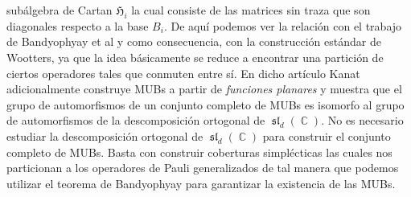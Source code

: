 \documentclass[a4paper]{report}
\DeclareMathOperator{\C}{\mathbb{C}}
\DeclareMathOperator{\Sl}{\mathfrak{sl}}
\begin{document}
  subálgebra de Cartan $\mathfrak{H}_i$ la cual consiste de
  las matrices sin traza que son diagonales respecto a la
  base $B_i$. De aquí podemos ver la relación con el trabajo
  de Bandyophyay et al y como consecuencia, con la
  construcción estándar de Wootters, ya que la idea
  básicamente se reduce a encontrar una partición de ciertos
  operadores tales que conmuten entre sí. En dicho artículo
  Kanat adicionalmente construye MUBs a partir de
  \textit{funciones planares} y muestra que el grupo de
  automorfismos de un conjunto completo de MUBs es isomorfo
  al grupo de automorfismos de la descomposición ortogonal
  de $\Sl_d(\C)$. No es necesario estudiar la descomposición
  ortogonal de $\Sl_d(\C)$ para construir el conjunto
  completo de MUBs. Basta con construir coberturas
  simplécticas las cuales nos particionan a los operadores
  de Pauli generalizados de tal manera que podemos utilizar
  el teorema de Bandyophyay para garantizar la existencia de
  las MUBs.
  
\end{document}
